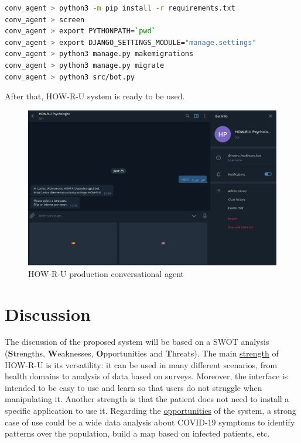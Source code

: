 \documentclass[12pt,english]{article}
\begin{document}
\begin{lstlisting}[mathescape=false, language=bash]
conv_agent > python3 -m pip install -r requirements.txt
conv_agent > screen
conv_agent > export PYTHONPATH=`pwd`
conv_agent > export DJANGO_SETTINGS_MODULE="manage.settings"
conv_agent > python3 manage.py makemigrations
conv_agent > python3 manage.py migrate
conv_agent > python3 src/bot.py
\end{lstlisting}

After that, HOW-R-U system is ready to be used.

\begin{figure}[H]
  \centering
    \includegraphics[width=\textwidth]{production.png}
    \caption{HOW-R-U production conversational agent}
\end{figure}


\section{Discussion}

The discussion of the proposed system will be based on a SWOT analysis (\textbf{S}trengths, \textbf{W}eaknesses, \textbf{O}pportunities and \textbf{T}hreats). The main \underline{strength} of HOW-R-U is its versatility: it can be used in many different scenarios, from health domains to analysis of data based on surveys. Moreover, the interface is intended to be easy to use and learn so that users do not struggle when manipulating it. Another strength is that the patient does not need to install a specific application to use it. Regarding the  \underline{opportunities} of the system, a strong case of use could be a wide data analysis about COVID-19 symptoms to identify patterns over the population, build a map based on infected patients, etc.
\end{document}

